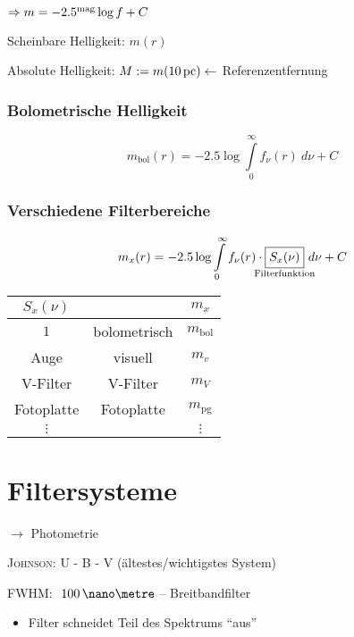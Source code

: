 $\Rightarrow m = -2.5^{\mathrm{mag}} \log f + C$

Scheinbare Helligkeit: $m(r)$

Absolute Helligkeit: $M := m(10\,{\mathrm{pc}}) \leftarrow$ Referenzentfernung

\subsubsection{Bolometrische Helligkeit}
\[ m_{\mathrm{bol}}(r) = -2.5 \log \int\limits_0^{\infty} f_\nu(r)\ d\nu + C \]

\subsubsection{Verschiedene Filterbereiche}
\[ m_x(r) = -2.5 \log \int\limits_{0}^{\infty} f_{\nu}(r) \cdot \underset{\mathclap{\text{Filterfunktion}}}{\boxed{S_x(\nu)}}\ d\nu + C \]

\begin{center}
    \begin{tabular}{ccc}
        $S_x(\nu)$      &                       & $m_x$ \\\hline
        $1$             & bolometrisch          & $m_{\mathrm{bol}}$ \\
        Auge            & visuell               & $m_v$ \\
        V-Filter        & V-Filter              & $m_V$ \\
        Fotoplatte      & Fotoplatte            & $m_{\mathrm{pg}}$ \\
        $\vdots$        &                       & $\vdots$ \\\hline
    \end{tabular}
\end{center}

\section{Filtersysteme}
$\rightarrow$ Photometrie

\textsc{Johnson}: U - B - V (ältestes/wichtigstes System)

FWHM: $~100\,\nano\metre$ -- Breitbandfilter


\begin{itemize}
    \item Filter schneidet Teil des Spektrums "`aus"'
\end{itemize}

